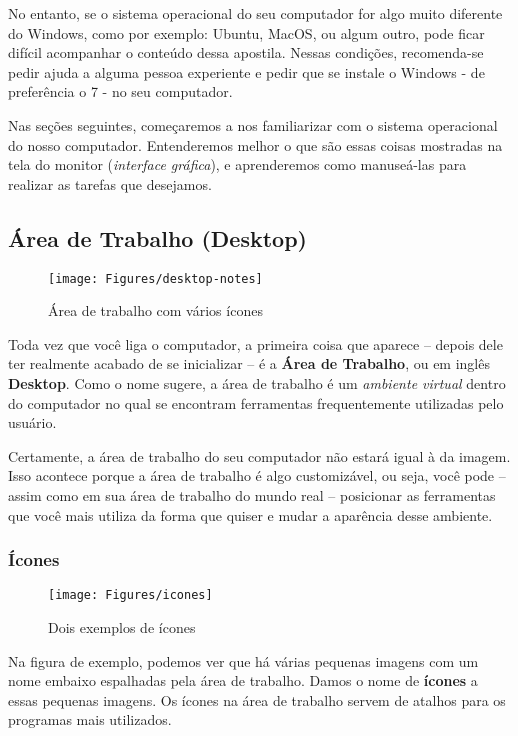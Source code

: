 \documentclass[hidelinks,12pt]{article}
\begin{document}
No entanto, se o sistema operacional do seu computador for algo muito diferente do Windows, como por exemplo: Ubuntu, MacOS, ou algum outro, pode ficar difícil acompanhar o conteúdo dessa apostila. Nessas condições, recomenda-se pedir ajuda a alguma pessoa experiente e pedir que se instale o Windows - de preferência o 7 - no seu computador.

Nas seções seguintes, começaremos a nos familiarizar com o sistema operacional do nosso computador. Entenderemos melhor o que são essas coisas mostradas na tela do monitor (\textit{interface gráfica}), e aprenderemos como manuseá-las para realizar as tarefas que desejamos.

\subsection{Área de Trabalho (Desktop)}

\begin{figure}[!h]
	\centering
	\texttt{[image: Figures/desktop-notes]}
	\caption{Área de trabalho com vários ícones}
	\label{fig:desktop-notes}
\end{figure}

Toda vez que você liga o computador, a primeira coisa que aparece – depois dele ter realmente acabado de se inicializar – é a \textbf{Área de Trabalho}, ou em inglês \textbf{Desktop}. Como o nome sugere, a área de trabalho é um \textit{ambiente virtual} dentro do computador no qual se encontram ferramentas frequentemente utilizadas pelo usuário. 

Certamente, a área de trabalho do seu computador não estará igual à da imagem. Isso acontece porque a área de trabalho é algo customizável, ou seja, você pode – assim como em sua área de trabalho do mundo real – posicionar as ferramentas que você mais utiliza da forma que quiser e mudar a aparência desse ambiente.

\subsubsection{Ícones}

\begin{figure}[!h]
	\centering
	\texttt{[image: Figures/icones]}
	\caption{Dois exemplos de ícones}
	\label{fig:icones}
\end{figure}

Na figura de exemplo, podemos ver que há várias pequenas imagens com um nome embaixo espalhadas pela área de trabalho. Damos o nome de \textbf{ícones} a essas pequenas imagens. Os ícones na área de trabalho servem de atalhos para os programas mais utilizados.
\end{document}
